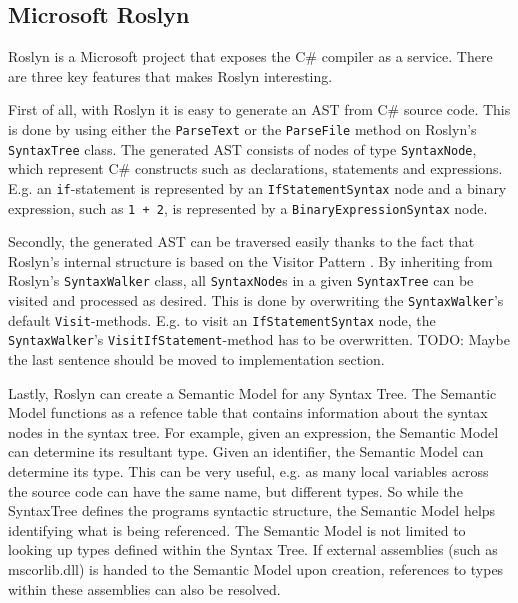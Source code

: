 \subsection{Microsoft Roslyn} %
\label{sub:microsoft_roslyn}
	Roslyn is a Microsoft project that exposes the C\# compiler as a service. There are three key features that makes Roslyn interesting.

	First of all, with Roslyn it is easy to generate an AST from C\# source code. This is done by using either the \texttt{ParseText} or the \texttt{ParseFile} method on Roslyn's \texttt{SyntaxTree} class. The generated AST consists of nodes of type \texttt{SyntaxNode}, which represent C\# constructs such as declarations, statements and expressions. E.g. an \texttt{if}-statement is represented by an \texttt{IfStatementSyntax} node and a binary expression, such as \texttt{1 + 2}, is represented by a \texttt{BinaryExpressionSyntax} node.

	Secondly, the generated AST can be traversed easily thanks to the fact that Roslyn's internal structure is based on the Visitor Pattern \cite{bib:visitorpattern}. By inheriting from Roslyn's \texttt{SyntaxWalker} class, all \texttt{SyntaxNode}s in a given \texttt{SyntaxTree} can be visited and processed as desired. This is done by overwriting the \texttt{SyntaxWalker}'s default \texttt{Visit}-methods. E.g. to visit an \texttt{IfStatementSyntax} node, the \texttt{SyntaxWalker}'s \texttt{VisitIfStatement}-method has to be overwritten.
	TODO: Maybe the last sentence should be moved to implementation section.

	Lastly, Roslyn can create a Semantic Model for any Syntax Tree. The Semantic Model functions as a refence table that contains information about the syntax nodes in the syntax tree. For example, given an expression, the Semantic Model can determine its resultant type. Given an identifier, the Semantic Model can determine its type. This can be very useful, e.g. as many local variables across the source code can have the same name, but different types. So while the SyntaxTree defines the programs syntactic structure, the Semantic Model helps identifying what is being referenced. The Semantic Model is not limited to looking up types defined within the Syntax Tree. If external assemblies (such as mscorlib.dll) is handed to the Semantic Model upon creation, references to types within these assemblies can also be resolved.


